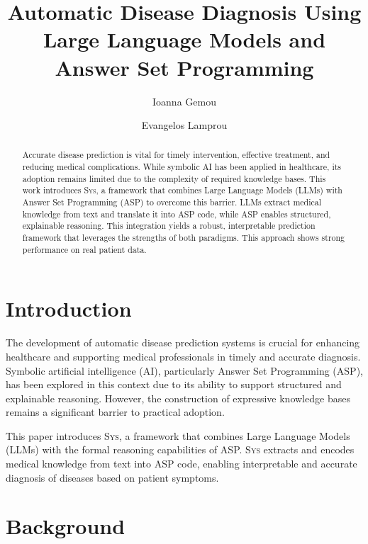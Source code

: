 \documentclass[10pt,leqno]{amsart}
\title{Automatic Disease Diagnosis Using Large Language Models and Answer Set Programming}
\author{
	Ioanna Gemou
	\and
	Evangelos Lamprou
}
\newcommand{\sys}{\textsc{Sys}\xspace}
\begin{document}
\maketitle
\begin{abstract}
Accurate disease prediction is vital for timely intervention, 
effective treatment, and reducing medical complications. 
While symbolic AI has been applied in healthcare, 
its adoption remains limited due to the complexity 
of required knowledge bases.
This work introduces \sys, a framework that combines Large Language Models (LLMs) 
with Answer Set Programming (ASP) to overcome this barrier. 
LLMs extract medical knowledge from text and translate it into ASP code, 
while ASP enables structured, explainable reasoning. 
This integration yields a robust, interpretable prediction framework 
that leverages the strengths of both paradigms. 
This approach shows strong performance on real patient data.
\end{abstract}

\section{Introduction}

The development of automatic disease prediction systems 
is crucial for enhancing healthcare and supporting medical 
professionals in timely and accurate diagnosis. 
Symbolic artificial intelligence (AI), particularly Answer Set Programming (ASP), 
has been explored in this context due to its ability 
to support structured and explainable reasoning. 
However, the construction of expressive knowledge bases 
remains a significant barrier to practical adoption.

This paper introduces \sys, a framework 
that combines Large Language Models (LLMs) with the 
formal reasoning capabilities of ASP.
\sys extracts and encodes medical knowledge from text into ASP code,
enabling interpretable and accurate diagnosis 
of diseases based on patient symptoms. 

\section{Background}
\end{document}
